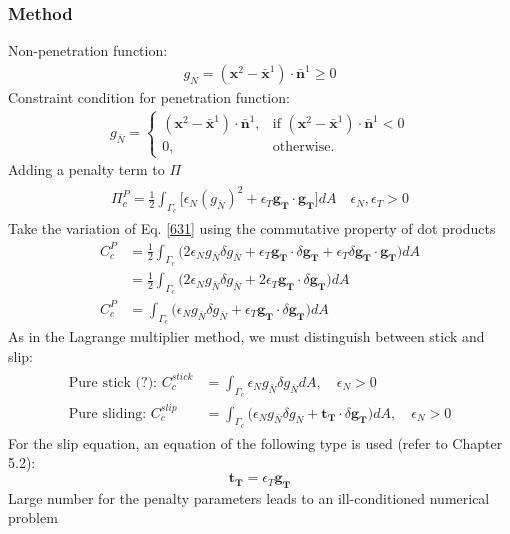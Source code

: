 \documentclass[12pt,3p]{article}
\numberwithin{equation}{section}
\begin{document}
\subsubsection{Method}
Non-penetration function:
\begin{align}\label{nonPenFun}
g_{N} = (\mathbf{x}^2 - \mathbf{\bar{x}}^1) \cdot \mathbf{\bar{n}}^1 \geq 0
\end{align}
Constraint condition for penetration function: 
\begin{align}\label{penFun}
g_{\bar{N}} = \begin{cases}
    			(\mathbf{x}^2 - \mathbf{\bar{x}}^1) \cdot \mathbf{\bar{n}}^1, & \text{if } (\mathbf{x}^2 - \mathbf{\bar{x}}^1) \cdot \mathbf{\bar{n}}^1 < 0 \\
    			0, & \text{otherwise}.
  		   \end{cases}
\end{align}
Adding a penalty term to $\Pi$
\begin{align}\label{631}
\begin{split}
\Pi_c^P = \frac{1}{2} \int_{\Gamma_c} \big[ \epsilon_N (g_{\bar{N}})^2 + \epsilon_T \mathbf{g_T} \cdot \mathbf{g_T} \big] dA \quad \epsilon_N, \epsilon_T > 0 
\end{split}
\end{align}
Take the variation of Eq. \ref{631} using the commutative property of dot products 
\begin{align*}
C_c^P &= \frac{1}{2} \int_{\Gamma_c} \big( 2 \epsilon_N g_{\bar{N}} \delta g_{\bar{N}} + \epsilon_T \mathbf{g_T} \cdot \delta \mathbf{g_T} + \epsilon_T \delta \mathbf{g_T} \cdot \mathbf{g_T} \big) dA \\
	&= \frac{1}{2} \int_{\Gamma_c} \big( 2 \epsilon_N g_{\bar{N}} \delta g_{\bar{N}} + 2 \epsilon_T \mathbf{g_T} \cdot \delta \mathbf{g_T} \big) dA \\
C_c^P &= \int_{\Gamma_c} \big(\epsilon_N g_{\bar{N}} \delta g_{\bar{N}} + \epsilon_T \mathbf{g_T} \cdot \delta \mathbf{g_T} \big) dA 
\end{align*}
As in the Lagrange multiplier method, we must distinguish between stick and slip:
\begin{align}\label{633}
\begin{split}
\text{Pure stick (?): }  C_c^{stick} &= \int_{\Gamma_c} \epsilon_N g_{\bar{N}} \delta g_{\bar{N}} dA,  \quad \epsilon_N > 0 \\
\text{Pure sliding: } C_c^{slip} &= \int_{\Gamma_c} \big(\epsilon_N g_{\bar{N}} \delta g_{\bar{N}} + \mathbf{t_T} \cdot \delta \mathbf{g_T} \big) dA, \quad \epsilon_N > 0
\end{split}
\end{align}
For the slip equation, an equation of the following type is used (refer to Chapter 5.2):
\begin{equation*}
\mathbf{t_T} = \epsilon_T \mathbf{g_T} 
\end{equation*}
Large number for the penalty parameters leads to an ill-conditioned numerical problem
\end{document}
